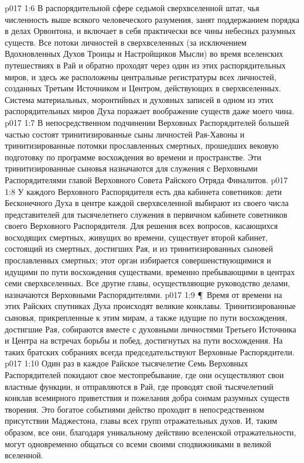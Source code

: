 \vs p017 1:6 В распорядительной сфере седьмой сверхвселенной штат, чья численность выше всякого человеческого разумения, занят поддержанием порядка в делах Орвонтона, и включает в себя практически все чины небесных разумных существ. Все потоки личностей в сверхвселенных (за исключением Вдохновленных Духов Троицы и Настройщиков Мысли) во время вселенских путешествиях в Рай и обратно проходят через один из этих распорядительных миров, и здесь же расположены центральные регистратуры всех личностей, созданных Третьим Источником и Центром, действующих в сверхвселенных. Система материальных, моронтийных и духовных записей в одном из этих распорядительных миров Духа поражает воображение существ даже моего чина.
\vs p017 1:7 В непосредственном подчинении Верховных Распорядителей большей частью состоят тринитизированные сыны личностей Рая\hyp{}Хавоны и тринитизированные потомки прославленных смертных, прошедших вековую подготовку по программе восхождения во времени и пространстве. Эти тринитизированные сыновья назначаются для служения с Верховными Распорядителями главой Верховного Совета Райского Отряда Финалитов.
\vs p017 1:8 У каждого Верховного Распорядителя есть два кабинета советников: дети Бесконечного Духа в центре каждой сверхвселенной выбирают из своего числа представителей для тысячелетнего служения в первичном кабинете советников своего Верховного Распорядителя. Для решения всех вопросов, касающихся восходящих смертных, живущих во времени, существует второй кабинет, состоящий из смертных, достигших Рая, и из тринитизированных сыновей прославленных смертных; этот орган избирается совершенствующимися и идущими по пути восхождения существами, временно пребывающими в центрах семи сверхвселенных. Все другие главы, осуществляющие руководство делами, назначаются Верховными Распорядителями.
\vs p017 1:9 \P\ Время от времени на этих Райских спутниках Духа происходят великие конклавы. Тринитизированные сыновья, прикрепленные к этим мирам, а также идущие по пути восхождения, достигшие Рая, собираются вместе с духовными личностями Третьего Источника и Центра на встречах борьбы и побед, достигнутых на пути восхождения. На таких братских собраниях всегда председательствуют Верховные Распорядители.
\vs p017 1:10 Один раз в каждое Райское тысячелетие Семь Верховных Распорядителей покидают свое местопребывание, где они осуществляют свои властные функции, и отправляются в Рай, где проводят свой тысячелетний конклав всемирного приветствия и пожелания добра сонмам разумных существ творения. Это богатое событиями действо проходит в непосредственном присутствии Маджестона, главы всех групп отражательных духов. И, таким образом, все они, благодаря уникальному действию вселенской отражательности, могут одновременно общаться со всеми своими сподвижниками в великой вселенной.
